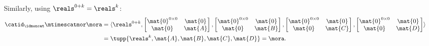 \begin{example}
\begin{equation*}
    \end{equation*}
    Similarly, using $\reals^{0+k} = \reals^k$:
    \begin{equation*}
        \begin{aligned}
            \catid_\idmoncat \mtimescatmor \mora & =
            \langle \reals^{0+k},
            \begin{bmatrix}\mat{0}^{0\times 0}&\mat{0}\\\mat{0}&\mat{A}\end{bmatrix},
            \begin{bmatrix}\mat{0}^{0\times 0}&\mat{0}\\\mat{0}&\mat{B}\end{bmatrix},
            \begin{bmatrix}\mat{0}^{0\times 0}&\mat{0}\\\mat{0}&\mat{C}\end{bmatrix},
            \begin{bmatrix}\mat{0}^{0\times 0}&\mat{0}\\\mat{0}&\mat{D}\end{bmatrix}\rangle \\
                                                 & =\tupp{\reals^k, \mat{A}, \mat{B}, \mat{C}, \mat{D}} = \mora.
        \end{aligned}
    \end{equation*}


\end{example}
